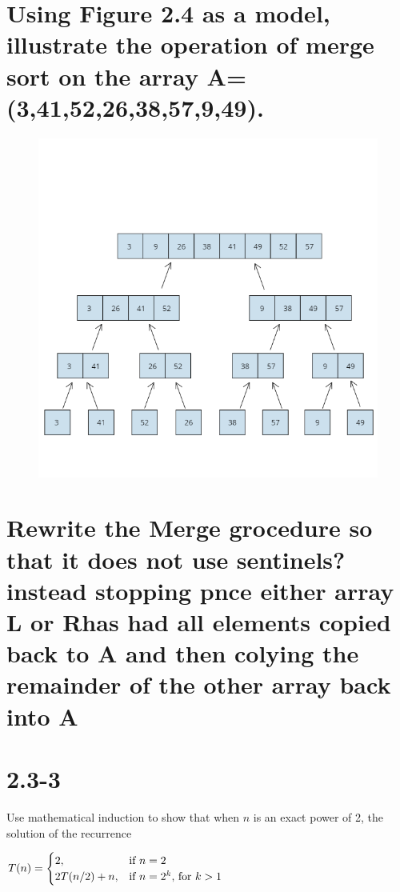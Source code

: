 \documentclass{article}
\begin{document}
\section{Using Figure 2.4 as a model, illustrate the operation of merge sort on the array A=(3,41,52,26,38,57,9,49).}
\begin{figure}[!htb] 
  \includegraphics[width=\textwidth]{2_3-1.png}
\end{figure}


\section{Rewrite the Merge grocedure so that it does not use sentinels? instead stopping pnce either array L or Rhas had all elements copied back to A and then colying the remainder of the other array back into A}


\section{2.3-3}
Use mathematical induction to show that when $n$ is an exact power of 2, the solution of the recurrence

$T(n) = 
\begin{cases}
 2, & \mbox{if  $n= 2$} \\
 2T(n/2)+n, & \mbox{if $ n=2^k$, for $k > 1$} 
\end{cases}$ 
\end{document}
